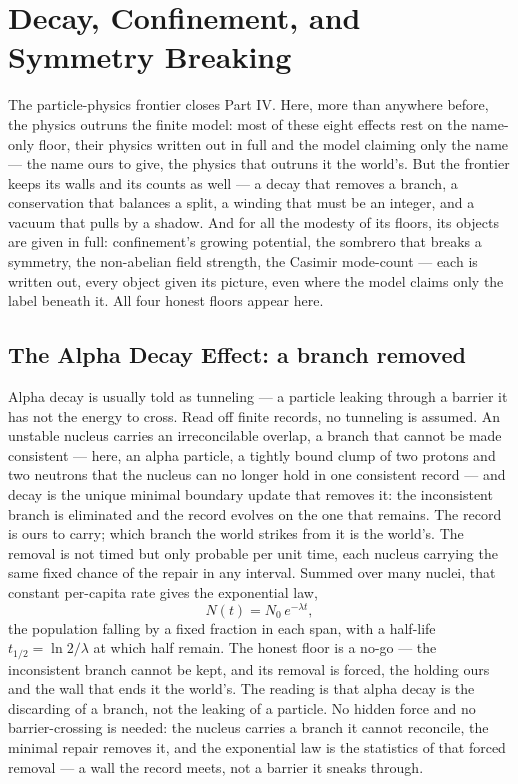 \chapter{Decay, Confinement, and Symmetry Breaking}
\label{chap:decay-confinement-symmetry}

The particle-physics frontier closes Part IV. Here, more than anywhere before, the
physics outruns the finite model: most of these eight effects rest on the name-only floor, their physics
written out in full and the model claiming only the name --- the name ours to give, the physics that outruns it
the world's. But the frontier keeps its walls and its counts as well --- a decay that removes a branch, a
conservation that balances a split, a winding that must be an integer, and a vacuum that pulls by a shadow. And
for all the modesty of its floors, its objects are given in full: confinement's growing potential, the sombrero
that breaks a symmetry, the non-abelian field strength, the Casimir mode-count --- each is written out, every
object given its picture, even where the model claims only the label beneath it. All four honest floors appear
here.

\section{The Alpha Decay Effect: a branch removed}
\label{se:alpha-decay}

Alpha decay is usually told as tunneling --- a particle leaking through a barrier it has not the energy to
cross. Read off finite records, no tunneling is assumed. An unstable nucleus carries an irreconcilable overlap,
a branch that cannot be made consistent --- here, an alpha particle, a tightly bound clump of two protons and
two neutrons that the nucleus can no longer hold in one consistent record --- and decay is the unique minimal
boundary update that removes it: the inconsistent branch is eliminated and the record evolves on the one that
remains. The record is ours to carry; which branch the world strikes from it is the world's. The removal is not timed but only probable per unit time, each nucleus carrying the same fixed chance
of the repair in any interval. Summed over many nuclei, that constant per-capita rate gives the exponential
law,
\begin{equation}
  N(t) = N_0\, e^{-\lambda t},
\end{equation}
the population falling by a fixed fraction in each span, with a half-life $t_{1/2} = \ln 2 / \lambda$ at which
half remain. The honest floor is a no-go --- the inconsistent branch cannot be kept, and its removal is forced,
the holding ours and the wall that ends it the world's.
The reading is that alpha decay is the discarding of a branch, not the leaking of a particle. No hidden force
and no barrier-crossing is needed: the nucleus carries a branch it cannot reconcile, the minimal repair removes
it, and the exponential law is the statistics of that forced removal --- a wall the record meets, not a barrier
it sneaks through.


